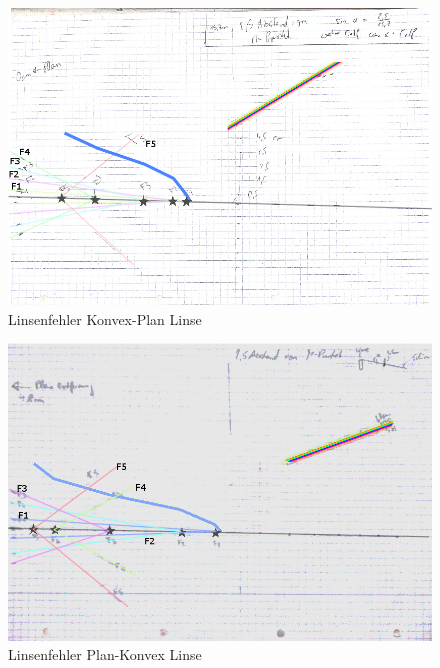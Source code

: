\documentclass[12pt,a4paper]{article}
\begin{document}
\pagebreak
\begin{figure}[H]
	\centering
	\includegraphics[scale=0.45]{./figure/konvex_plan.png}
	\caption{Linsenfehler Konvex-Plan Linse}
	\label{fig:linsenfehler_strahlen_konvex_plan}
\end{figure}
\noindent
\begin{figure}[H]
	\centering
	\includegraphics[scale=0.45]{./figure/plan_konvex.png}
	\caption{Linsenfehler Plan-Konvex Linse}
	\label{fig:linsenfehler_strahlen_plan_konvex}
\end{figure}
\pagebreak
\end{document}
